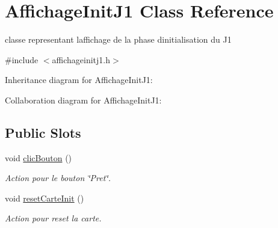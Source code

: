 \hypertarget{class_affichage_init_j1}{}\section{Affichage\+Init\+J1 Class Reference}
\label{class_affichage_init_j1}


classe representant l\textquotesingle{}affichage de la phase d\textquotesingle{}initialisation du J1  




{\ttfamily \#include $<$affichageinitj1.\+h$>$}



Inheritance diagram for Affichage\+Init\+J1\+:


Collaboration diagram for Affichage\+Init\+J1\+:
\subsection*{Public Slots}
\begin{DoxyCompactItemize}
\item 
void \hyperlink{class_affichage_init_j1_a0ff516a3f3cc659cfb47e489076e99ac}{clic\+Bouton} ()
\begin{DoxyCompactList}\small\item\em Action pour le bouton \char`\"{}\+Pret\char`\"{}. \end{DoxyCompactList}\item 
void \hyperlink{class_affichage_init_j1_a785223ce5e31cc613821618c569210ca}{reset\+Carte\+Init} ()
\begin{DoxyCompactList}\small\item\em Action pour reset la carte. \end{DoxyCompactList}\end{DoxyCompactItemize}
